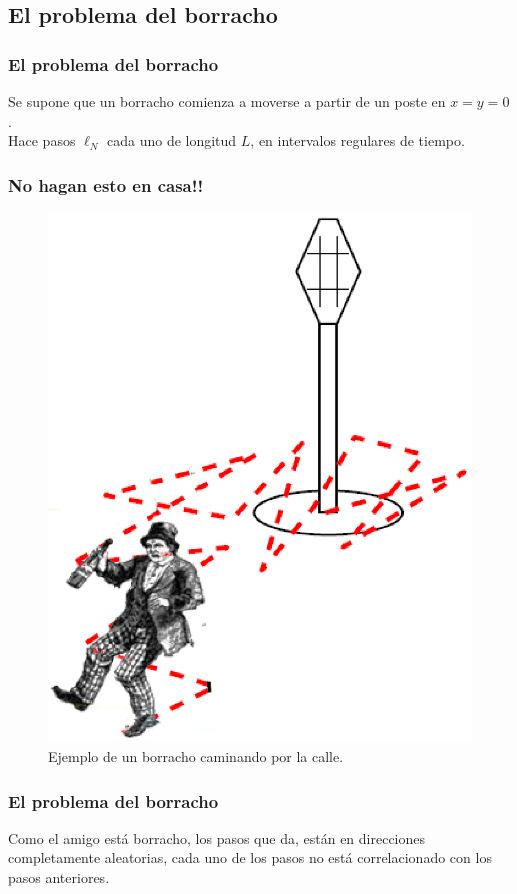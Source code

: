 \documentclass[12pt]{beamer}
\begin{document}
\subsection{El problema del borracho}

\begin{frame}
\frametitle{El problema del borracho}
Se supone que un borracho comienza a moverse a partir de un poste en $x = y = 0$.
\\
\bigskip
\pause
Hace pasos $\ell_{N}$ cada uno de longitud $L$, en intervalos regulares de tiempo.
\end{frame}
\begin{frame}
\frametitle{No hagan esto en casa!!}
\begin{figure}
	\centering
	\includegraphics[scale=0.35]{Imagenes/Borracho_03.eps}
	\caption{Ejemplo de un borracho caminando por la calle.}
\end{figure}
\end{frame}
\begin{frame}
\frametitle{El problema del borracho}
Como el amigo está borracho, los pasos que da, están en direcciones completamente aleatorias, \pause cada uno de los pasos no está correlacionado con los pasos anteriores.
\end{frame}
\end{document}
